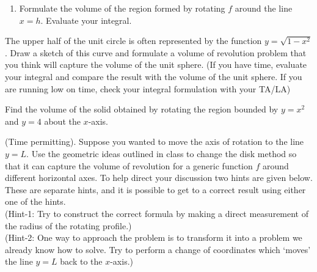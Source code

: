 \documentclass{ximera}
\begin{document}
\begin{exercise}
\begin{enumerate}
        \item Formulate the volume of the region formed by rotating $f$ around the line $x=h$.  Evaluate your integral.  



    \end{enumerate}
\end{exercise}

\begin{exercise}
    The upper half of the unit circle is often represented by the function $y = \sqrt{1-x^2}$. Draw a sketch of this curve and formulate a volume of revolution problem that you think will capture the volume of the unit sphere. (If you have time, evaluate your integral and compare the result with the volume of the unit sphere. If you are running low on time, check your integral formulation with your TA/LA)
\end{exercise}

\begin{exercise}
    Find the volume of the solid obtained by rotating the region bounded by $y=x^2$ and $y=4$ about the $x$-axis.  
\end{exercise}

\begin{exercise}
    (Time permitting). Suppose you wanted to move the axis of rotation to the line $y=L$. Use the geometric ideas outlined in class to change the disk method so that it can capture the volume of revolution for a generic function $f$ around different horizontal axes. To help direct your discussion two hints are given below. These are separate hints, and it is possible to get to a correct result using either one of the hints.\\


    (Hint-1: Try to construct the correct formula by making a direct measurement of the radius of the rotating profile.)\\

    (Hint-2: One way to approach the problem is to transform it into a problem we already know how to solve. Try to perform a change of coordinates which `moves' the line $y=L$ back to the $x$-axis.)\\
\end{exercise}
\end{document}
